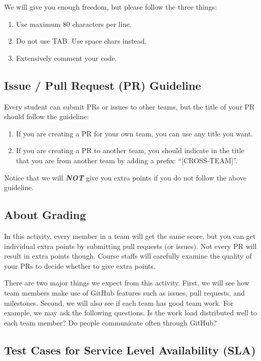 \documentclass[a4paper, 11pt]{article}
\theoremstyle{definition}
\begin{document}
{We will give you enough freedom, but please follow the three things:
\begin{enumerate}

  \item Use maximum 80 characters per line.
  \item Do not use TAB. Use space chars instead.
  \item Extensively comment your code.

\end{enumerate}

\subsection{Issue / Pull Request (PR) Guideline}

Every student can submit PRs or issues to other teams, but the title
of your PR should follow the guideline:
%
\begin{enumerate}
%
  \item If you are creating a PR for your own team, you can use any
    title you want.
%
  \item If you are creating a PR to another team, you should indicate
    in the title that you are from another team by adding a prefix:
    ``[CROSS-TEAM]''.
%
\end{enumerate}
%
Notice that we will \textbf{\emph{NOT}} give you extra points if you do not
follow the above guideline.

\subsection{About Grading}

In this activity, every member in a team will get the same score, but
you can get individual extra points by submitting pull requests (or
issues). Not every PR will result in extra points though.  Course
staffs will carefully examine the quality of your PRs to decide
whether to give extra points.

There are two major things we expect from this activity. First, we
will see how team members make use of GitHub features such as issues,
pull requests, and milestones. Second, we will also see if each team
has good team work. For example, we may ask the following questions.
Is the work load distributed well to each team member? Do people
communicate often through GitHub?

\subsection{Test Cases for Service Level Availability (SLA)}
\label{ss:sla}

}
\end{document}
